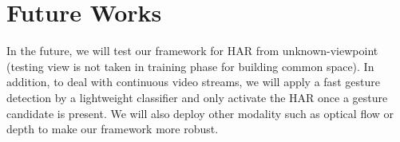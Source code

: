 
\section{Future Works} \label{sec:future_works}

    In the future, we will test our framework for HAR from unknown-viewpoint (testing view is not taken in training phase for building common space). In addition, to deal with continuous video streams, we will apply a fast gesture detection by a lightweight classifier and only activate the HAR once a gesture candidate is present. We will also deploy other modality such as optical flow or depth to make our framework more robust. 

